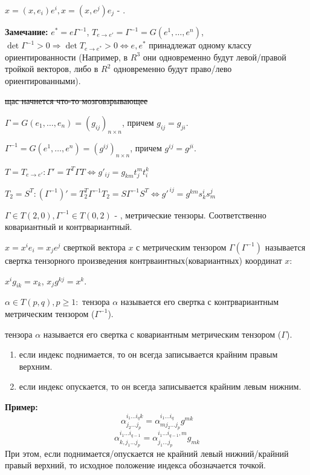 $x = (x,e_i)e^i, x= (x,e^j)e_j$ - .

\textbf{Замечание:} $e^* = e \Gamma^{-1}$, $T_{e\rightarrow e'} =\Gamma^{-1}  = G(e^1,\ldots, e^n)$, $ \det \Gamma^{-1}>0\Rightarrow \det T_{e\rightarrow e^*}>0 \Leftrightarrow e, e^*$ принадлежат одному классу ориентированности (Например, в $R^3$ они одновременно будут левой/правой тройкой векторов, либо в $R^2$ одновременно будут право/лево ориентированными).

\sout{щас начнется что-то мозговзрывающее}

$\Gamma = G(e_1,\ldots,e_n)=(g_{ij})_{n \times n}$, причем $g_{ij}=g_{ji}$.

$\Gamma^{-1}= G(e^1,\ldots, e^n)= (g^{ij})_{n\times n}$, причем $g^{ij} = g^{ji}$.

$T = T_{e\rightarrow e'}: \Gamma' = T^T \Gamma T \Leftrightarrow g'_{ij}= g_{km}t_j^m t_i^k$

$T_2 = S^T: (\Gamma^{-1})' = T_2^T \Gamma^{-1} T_2 = S \Gamma^{-1}S^T \Leftrightarrow g'^{\, ij} = g^{km}s_k^i s_m^j$

 $\Gamma \in T(2,0), \Gamma^{-1}\in T(0,2)$ - , метрические тензоры. Соответственно ковариантный и контрвариантный.

 $x = x^ie_i = x_j e^j$ сверткой вектора $x$ с метрическим тензором $\Gamma(\Gamma^{-1})$ называется свертка тензорного произведения контрваинтных(ковариантных) координат $x$:

$x^i g_{ik} = x_k$, $x_j g^{kj}= x^k$.

 $\alpha \in T(p,q), p \geq 1:$  тензора $\alpha$ называется его свертка с контрвариантным метрическим тензором ($\Gamma^{-1}$).

 тензора $\alpha$ называется его свертка с ковариантным метрическим тензором ($\Gamma$).

\begin{enumerate}
    \item если индекс поднимается, то он всегда записывается крайним правым верхним.
    \item если индекс опускается, то он всегда записывается крайним левым нижним.
\end{enumerate}

\textbf{Пример:}
$$\alpha_{j_2\ldots j_p}^{i_1\ldots i_qk} = \alpha^{i_1\ldots i_q}_{mj_2\ldots j_p} g^{mk}$$
$$\alpha_{k,j_1\ldots j_p}^{i_1\ldots i_{q-1}} = \alpha^{i_1\ldots i_{q-1},m}_{j_1\ldots j_p} g_{mk}$$
При этом, если поднимается/опускается не крайний левый нижний/крайний правый верхний, то исходное положение индекса обозначается точкой. 

